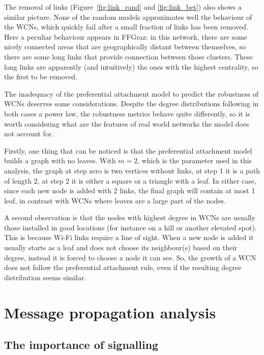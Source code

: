 \documentclass[a4paper,11pt,twoside,openleft]{memoir}
\newcommand{\figref}[1] {Figure~\ref{#1}}
\begin{document}
The removal of links (\figref{fig:link_rand} and \ref{fig:link_bet})
also shows a similar picture. None of the random
models approximates well the behaviour of the WCNs, which quickly fail
after a small fraction of links has been removed. Here a peculiar
behaviour appears in FFGraz: in this network, there are some nicely
connected areas that are geographically distant between themselves, so
there are some long links that provide connection between those
clusters. These long links are apparently (and intuitively) the ones
with the highest centrality, so the first to be removed.

The inadequacy of the preferential attachment model to predict the
robustness of WCNs deserves some considerations. Despite the degree
distributions following in both cases a power law, the robustness
metrics behave quite differently, so it is worth considering what are
the features of real world networks the model does not account for.

Firstly, one thing that can be noticed is that the preferential
attachment model builds a graph with no leaves. With $m = 2$, which is
the parameter used in this analysis, the graph at step zero is two
vertices without links, at step 1 it is a path of length 2, at step 2 it
is either a square or a triangle with a leaf.
In either case, since each new node is added with 2 links, the final
graph will contain at most 1 leaf, in contrast with WCNs where leaves
are a large part of the nodes.

A second observation is that the nodes with highest degree in WCNs
are usually those installed in good locations (for instance on a hill
or another elevated spot). This is because Wi-Fi links require a line
of sight.
When a new node is added it usually starts as a leaf and does not choose
its neighbour(s) based on their degree, instead it is forced to choose
a node it can see.
So, the growth of a WCN does not follow the preferential attachment rule,
even if the resulting degree distribution seems similar.

\chapter{Message propagation analysis}\label{message-propagation-analysis}

\section{The importance of signalling}\label{the-importance-of-signalling}
\end{document}
